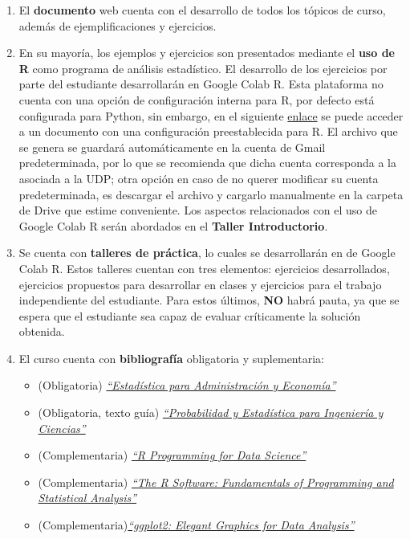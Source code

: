 \documentclass[
]{book}
\begin{document}
\begin{enumerate}
\def\labelenumi{\arabic{enumi}.}
\item
  El \textbf{documento} web cuenta con el desarrollo de todos los tópicos de curso, además de ejemplificaciones y ejercicios.
\item
  En su mayoría, los ejemplos y ejercicios son presentados mediante el \textbf{uso de R} como programa de análisis estadístico. El desarrollo de los ejercicios por parte del estudiante desarrollarán en Google Colab R. Esta plataforma no cuenta con una opción de configuración interna para R, por defecto está configurada para Python, sin embargo, en el siguiente \href{https://colab.to/r}{enlace} se puede acceder a un documento con una configuración preestablecida para R. El archivo que se genera se guardará automáticamente en la cuenta de Gmail predeterminada, por lo que se recomienda que dicha cuenta corresponda a la asociada a la UDP; otra opción en caso de no querer modificar su cuenta predeterminada, es descargar el archivo y cargarlo manualmente en la carpeta de Drive que estime conveniente. Los aspectos relacionados con el uso de Google Colab R serán abordados en el \textbf{Taller Introductorio}.
\item
  Se cuenta con \textbf{talleres de práctica}, lo cuales se desarrollarán en de Google Colab R. Estos talleres cuentan con tres elementos: ejercicios desarrollados, ejercicios propuestos para desarrollar en clases y ejercicios para el trabajo independiente del estudiante. Para estos últimos, \textbf{NO} habrá pauta, ya que se espera que el estudiante sea capaz de evaluar críticamente la solución obtenida.
\item
  El curso cuenta con \textbf{bibliografía} obligatoria y suplementaria:

  \begin{itemize}
  \item
    (Obligatoria) \href{https://github.com/Dfranzani/Bases-de-datos-para-cursos/blob/main/Libros/Anderson\%2C\%20Estad\%C3\%ADstica.pdf}{\emph{``Estadística para Administración y Economía''}} \citep{anderson}
  \item
    (Obligatoria, texto guía) \href{https://github.com/Dfranzani/Bases-de-datos-para-cursos/blob/main/Libros/Devore\%2C\%20Probabilidad\%20y\%20Estad\%C3\%ADstica.pdf}{\emph{``Probabilidad y Estadística para Ingeniería y Ciencias''}} \citep{Devore}
  \item
    (Complementaria) \href{https://bookdown.org/rdpeng/rprogdatascience/}{\emph{``R Programming for Data Science''}} \citep{peng2016r}
  \item
    (Complementaria) \href{https://github.com/Dfranzani/Bases-de-datos-para-cursos/blob/main/Libros/Micheaux\%2C\%20Manual\%20de\%20R.pdf}{\emph{``The R Software: Fundamentals of Programming and Statistical Analysis''}} \citep{deMicheaux2013}
  \item
    (Complementaria)\href{https://ggplot2-book.org/}{\emph{``ggplot2: Elegant Graphics for Data Analysis''}} \citep{wickham_ggplot2_2009}
  \end{itemize}


\end{enumerate}
\end{document}
